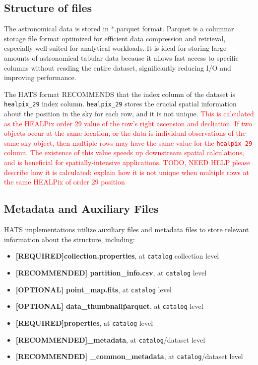 \documentclass[11pt,a4paper]{ivoa}
\begin{document}
     \subsection{Structure of files} \label{sec:parquet}
The astronomical data is stored in *.parquet format. Parquet is a columnar storage file format optimized for efficient data compression and retrieval, especially well-suited for analytical workloads. It is ideal for storing large amounts of astronomical tabular data because it allows fast access to specific columns without reading the entire dataset, significantly reducing I/O and improving performance. \par
The HATS format RECOMMENDS that the index column of the dataset is \texttt{healpix\_29} index column.  \texttt{healpix\_29} stores the crucial spatial information about the position in the sky for each row, and it is not unique.
\textcolor{red}{This is calculated as the HEALPix order 29 value of the row's right ascension and decliation. If two objects occur at the same location, or the data is individual observations of the same sky object, then multiple rows may have the same value for the \texttt{healpix\_29} column.
The existence of this value speeds up downstream spatial calculations, and is beneficial for spatially-intensive applications.}
\textcolor{red}{TODO, NEED HELP please describe how it is calculated; explain how it is not unique when multiple rows at the same HEALPix of order 29 position} 

    \subsection{Metadata and Auxiliary Files} \label{sec:meta}
    HATS implementations utilize auxiliary files and metadata files to store relevant information about the  structure, including:
    \begin{itemize}
    	\item \textbf{[REQUIRED]collection.properties}, at  \texttt{catalog} collection level
         \item \textbf{[RECOMMENDED] partition\_info.csv}, at  \texttt{catalog} level
        \item \textbf{[OPTIONAL] point\_map.fits}, at  \texttt{catalog} level
        \item \textbf{[OPTIONAL] data\_thumbnail\.parquet}, at  \texttt{catalog} level
        \item \textbf{[REQUIRED]properties}, at  \texttt{catalog} level
        \item \textbf{[RECOMMENDED]\_metadata}, at  \texttt{catalog}/dataset level
        \item \textbf{[RECOMMENDED] \_common\_metadata}, at  \texttt{catalog}/dataset level
    \end{itemize}
    
\end{document}
